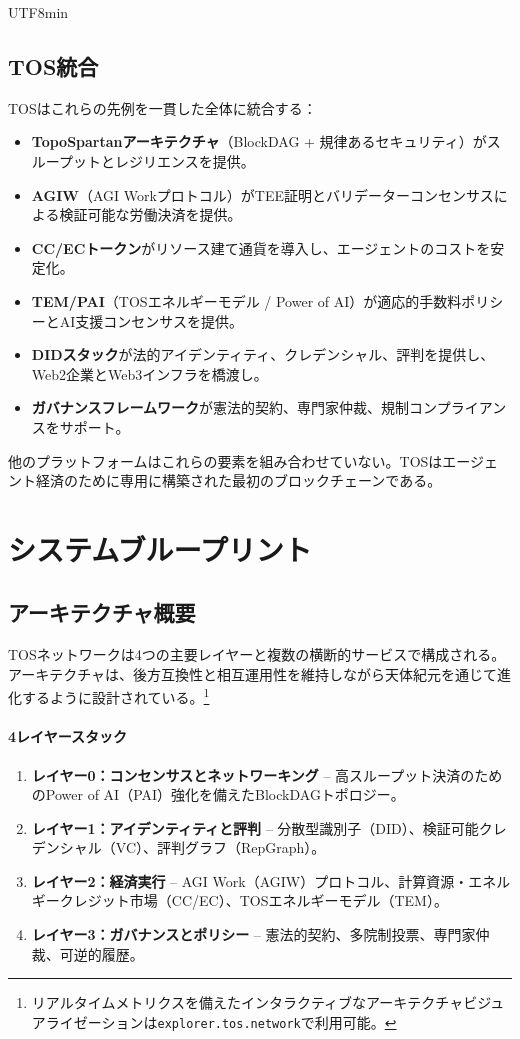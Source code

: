 \documentclass[11pt]{article}
\begin{document}
\begin{CJK}{UTF8}{min}
\subsection{TOS統合}
TOSはこれらの先例を一貫した全体に統合する：
\begin{itemize}[noitemsep]
  \item \textbf{TopoSpartanアーキテクチャ}（BlockDAG + 規律あるセキュリティ）がスループットとレジリエンスを提供。
  \item \textbf{AGIW}（AGI Workプロトコル）がTEE証明とバリデーターコンセンサスによる検証可能な労働決済を提供。
  \item \textbf{CC/ECトークン}がリソース建て通貨を導入し、エージェントのコストを安定化。
  \item \textbf{TEM/PAI}（TOSエネルギーモデル / Power of AI）が適応的手数料ポリシーとAI支援コンセンサスを提供。
  \item \textbf{DIDスタック}が法的アイデンティティ、クレデンシャル、評判を提供し、Web2企業とWeb3インフラを橋渡し。
  \item \textbf{ガバナンスフレームワーク}が憲法的契約、専門家仲裁、規制コンプライアンスをサポート。
\end{itemize}

他のプラットフォームはこれらの要素を組み合わせていない。TOSはエージェント経済のために専用に構築された最初のブロックチェーンである。

\section{システムブループリント}
\subsection{アーキテクチャ概要}
TOSネットワークは4つの主要レイヤーと複数の横断的サービスで構成される。アーキテクチャは、後方互換性と相互運用性を維持しながら天体紀元を通じて進化するように設計されている。\footnote{リアルタイムメトリクスを備えたインタラクティブなアーキテクチャビジュアライゼーションは\texttt{explorer.tos.network}で利用可能。}

\paragraph{4レイヤースタック}
\begin{enumerate}[noitemsep]
  \item \textbf{レイヤー0：コンセンサスとネットワーキング} -- 高スループット決済のためのPower of AI（PAI）強化を備えたBlockDAGトポロジー。
  \item \textbf{レイヤー1：アイデンティティと評判} -- 分散型識別子（DID）、検証可能クレデンシャル（VC）、評判グラフ（RepGraph）。
  \item \textbf{レイヤー2：経済実行} -- AGI Work（AGIW）プロトコル、計算資源・エネルギークレジット市場（CC/EC）、TOSエネルギーモデル（TEM）。
  \item \textbf{レイヤー3：ガバナンスとポリシー} -- 憲法的契約、多院制投票、専門家仲裁、可逆的履歴。
\end{enumerate}


\end{CJK}
\end{document}
